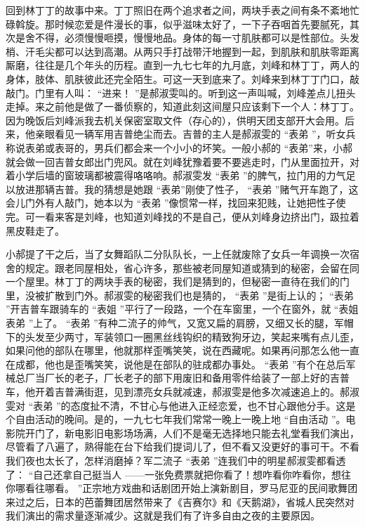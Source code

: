 \documentclass[12pt,twoside,openany]{book}
\begin{document}
回到林丁丁的故事中来。丁丁照旧在两个追求者之间，两块手表之间有条不紊地忙碌斡旋。那时候恋爱是件漫长的事，似乎滋味太好了，一下子吞咽首先要腻死，其次是舍不得，必须慢慢咂摸，慢慢地品。身体的每一寸肌肤都可以是性部位。头发梢、汗毛尖都可以达到高潮。从两只手打战带汗地握到一起，到肌肤和肌肤零距离厮磨，往往是几个年头的历程。直到一九七七年的九月底，刘峰和林丁丁，两人的身体，肢体、肌肤彼此还完全陌生。可这一天到底来了。刘峰来到林丁丁门口，敲敲门。门里有人叫： “进来！ ”是郝淑雯叫的。听到这一声叫喊，刘峰差点儿扭头走掉。来之前他是做了一番侦察的，知道此刻这间屋只应该剩下一个人：林丁丁。因为晚饭后刘峰派我去机关保密室取文件（存心的），供明天团支部开大会用。后来，他亲眼看见一辆军用吉普绝尘而去。吉普的主人是郝淑雯的 “表弟 ”，听女兵称说表弟或表哥的，男兵们都会来一个小小的坏笑。一般小郝的 “表弟”来，小郝就会做一回吉普女郎出门兜风。就在刘峰犹豫着要不要逃走时，门从里面拉开，对着小学后墙的窗玻璃都被震得咯咯响。郝淑雯发 “表弟 ”的脾气，拉门用的力气足以放进那辆吉普。我的猜想是她跟 “表弟”刚使了性子， “表弟 ”赌气开车跑了，这会儿门外有人敲门，她本以为 “表弟 ”像惯常一样，找回来犯贱，让她把性子使完。可一看来客是刘峰，也知道刘峰找的不是自己，便从刘峰身边挤出门，趿拉着黑皮鞋走了。

小郝提了干之后，当了女舞蹈队二分队队长，一上任就废除了女兵一年调换一次宿舍的规定。跟老同屋相处，省心许多，那些被老同屋知道或猜到的秘密，会留在同一个屋里。林丁丁的两块手表的秘密，我们是猜到的，但秘密一直待在我们的门里，没被扩散到门外。郝淑雯的秘密我们也是猜的， “表弟 ”是街上认的； “表弟 ”开吉普车跟骑车的 “表姐 ”平行了一段路，一个在车窗里，一个在窗外，就 “表姐表弟 ”上了。 “表弟 ”有种二流子的帅气，又宽又扁的肩膀，又细又长的腿，军帽下的头发至少两寸，军装领口一圈黑丝线钩织的精致狗牙边，笑起来嘴有点儿歪，如果问他的部队在哪里，他就那样歪嘴笑笑，说在西藏呢。如果再问那怎么他一直在成都，他也是歪嘴笑笑，说他是在部队的驻成都办事处。 “表弟 ”有个在总后军械总厂当厂长的老子，厂长老子的部下用废旧和备用零件给装了一部上好的吉普车，他开着吉普满街逛，见到漂亮女兵就减速，郝淑雯是他多次减速追上的。郝淑雯对 “表弟 ”的态度扯不清，不甘心与他进入正经恋爱，也不甘心跟他分手。这是个自由活动的晚间。是的，一九七七年我们常常一晚上一晚上地 “自由活动 ”。电影院开门了，新电影旧电影场场满，人们不是毫无选择地只能去礼堂看我们演出，尽管看了八遍了，熟得能在台下给我们提词儿了，但不看又没更好的事可干。不看我们夜也太长了，怎样消磨掉？军二流子 “表弟 ”连我们中的明星郝淑雯都看透了： “自己还拿自己挺当人 ——一张免费票就把你看了！想咋看你咋看你，想往你哪看往哪看。 ”正宗地方戏曲和话剧团开始上演新剧目，罗马尼亚的民间歌舞团来过之后，日本的芭蕾舞团居然带来了《吉赛尔》和《天鹅湖》，省城人民突然对我们演出的需求量逐渐减少。这就是我们有了许多自由之夜的主要原因。
\end{document}

